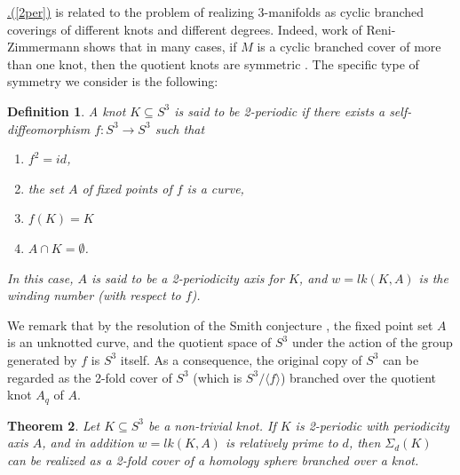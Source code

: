 \documentclass[11pt]{amsart}
\newtheorem{theorem}{Theorem}[section]
\newtheorem{definition}[theorem]{Definition}
\newcommand{\Crefparts}[2]{%
  \hyperref[#2]{\Cref*{#1}.(\ref*{#2})}%
}
\begin{document}
\Crefparts{mainthm}{2per} is related to the problem of realizing 3-manifolds as cyclic branched coverings of different knots and different degrees. Indeed, work of Reni-Zimmermann shows that in many cases, if $M$ is a cyclic branched cover of more than one knot, then the quotient knots are symmetric \cite{reni-zim}. The specific type of symmetry we consider is the following:

\begin{definition}\label{def:2per} A knot $K\subseteq S^3$ is said to be 2-periodic if there exists a self-diffeomorphism $f:S^3\to S^3$ such that
\begin{enumerate}
\item $f^2=id$,
\item the set $A$ of fixed points of $f$ is a curve,
\item $f(K)=K$
\item $A\cap K=\emptyset$.
\end{enumerate}
In this case, $A$ is said to be a 2-periodicity axis for $K$, and $w=lk(K,A)$ is the winding number (with respect to $f$).
\end{definition}

We remark that by the resolution of the Smith conjecture \cite{smith-conj}, the fixed point set $A$ is an unknotted curve, and the quotient space of $S^3$ under the action of the group generated by $f$ is $S^3$ itself. As a consequence, the original copy of $S^3$ can be regarded as the 2-fold cover of $S^3$ (which is $S^3/\langle f\rangle$) branched over the quotient knot $A_q$ of $A$.

\begin{theorem}\label{2per-to-2fold} Let $K\subseteq S^3$ be a non-trivial knot. If $K$ is 2-periodic with periodicity axis $A$, and in addition $w=lk(K,A)$ is relatively prime to $d$, then $\Sigma_d(K)$ can be realized as a 2-fold cover of a homology sphere branched over a knot.
\end{theorem}
\end{document}
